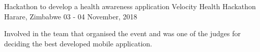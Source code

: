 

\begin{cventries}

  \cventry
    {Hackathon to develop a health awareness application} %
    {Velocity Health Hackathon} %
    {Harare, Zimbabwe} %
    {03 - 04 November, 2018} %
    {
      \begin{cvitems} %
        \item {Involved in the team that organised the event and was one of the judges for deciding the best developed mobile application.}
      \end{cvitems}
    }

  

\end{cventries}
\pagebreak